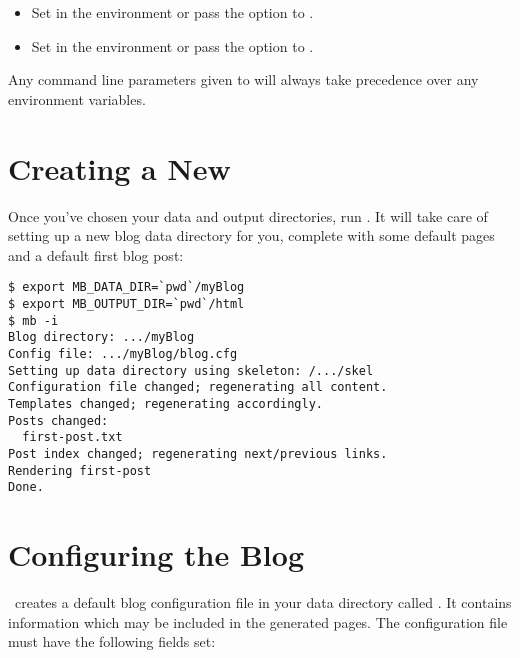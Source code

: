 \documentclass[11pt, letterpaper, oneside, titlepage]{book}
\begin{document}
\begin{itemize}
\item{Set  in the environment or pass the
   option to .}
\item{Set  in the environment or pass the
   option to .}
\end{itemize}

Any command line parameters given to  will always take
precedence over any environment variables.

\section{Creating a New \mathblog}

Once you've chosen your data and output directories, run .
It will take care of setting up a new blog data directory for you,
complete with some default pages and a default first blog post:

\begin{verbatim}
$ export MB_DATA_DIR=`pwd`/myBlog
$ export MB_OUTPUT_DIR=`pwd`/html
$ mb -i
Blog directory: .../myBlog
Config file: .../myBlog/blog.cfg
Setting up data directory using skeleton: /.../skel
Configuration file changed; regenerating all content.
Templates changed; regenerating accordingly.
Posts changed:
  first-post.txt
Post index changed; regenerating next/previous links.
Rendering first-post
Done.
\end{verbatim}

\section{Configuring the Blog}

\mathblog\ creates a default blog configuration file in your data
directory called .  It contains information which may be
included in the generated pages.  The configuration file 
must have the following fields set:
\end{document}
